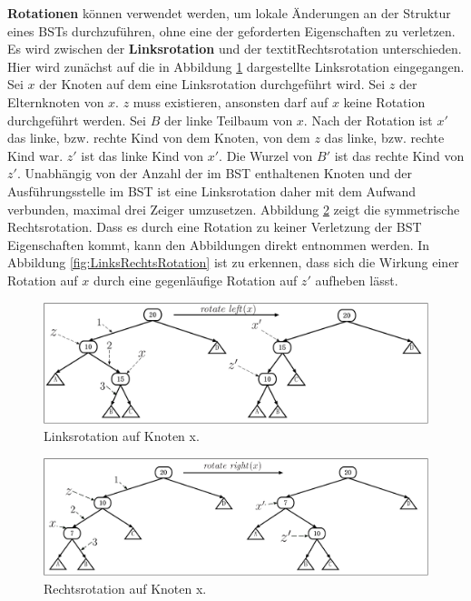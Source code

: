\documentclass[a4paper,12pt]{article}
\begin{document}
\noindent\textbf{Rotationen} können verwendet werden, um lokale Änderungen an der Struktur eines BSTs durchzuführen, ohne eine der geforderten Eigenschaften zu verletzen. Es wird zwischen der \textbf{Linksrotation} und der textit{Rechtsrotation} unterschieden. Hier wird zunächst auf die in Abbildung \ref{fig:Linksrotation} dargestellte Linksrotation eingegangen. 
Sei $x$ der Knoten auf dem eine Linksrotation durchgeführt wird. Sei $z$ der Elternknoten von $x$. $z$ muss existieren, ansonsten darf auf $x$ keine Rotation durchgeführt werden. Sei $B$ der linke Teilbaum von $x$. Nach der Rotation ist $x'$ das linke, bzw. rechte Kind von dem Knoten, von dem $z$ das linke, bzw. rechte Kind war. $z'$ ist das linke Kind von $x'$. Die Wurzel von $B '$ ist das rechte Kind von $z'$. Unabhängig von der Anzahl der im BST enthaltenen Knoten und der Ausführungsstelle im BST ist eine Linksrotation daher mit dem Aufwand verbunden, maximal drei Zeiger umzusetzen. Abbildung \ref{fig:Rechtsrotation} zeigt die symmetrische Rechtsrotation. Dass es durch eine Rotation zu keiner Verletzung der BST Eigenschaften kommt, kann den Abbildungen direkt entnommen werden. In Abbildung \ref{fig:LinksRechtsRotation} ist zu erkennen, dass sich die Wirkung einer Rotation auf $x$ durch eine gegenläufige Rotation auf $z'$ aufheben lässt.  
\begin{figure}[H]
	\centering
	\includegraphics[width= 1\textwidth]{Medien/Einleitung/Linksrotation}
	\caption{Linksrotation auf Knoten x. }
	\label{fig:Linksrotation}
\end{figure}
\begin{figure}[H]
	\centering
	\includegraphics[width= 1\textwidth]{Medien/Einleitung/Rechtsrotation}
	\caption{Rechtsrotation auf Knoten x. }
	\label{fig:Rechtsrotation}
\end{figure}
\end{document}
